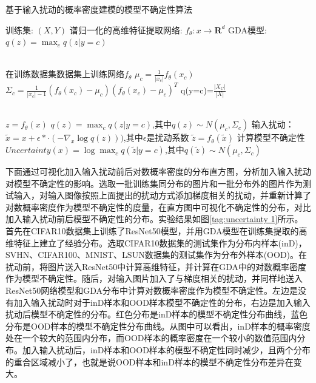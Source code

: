 \begin{algorithm}[h]
	\caption{基于输入扰动的概率密度建模的模型不确定性算法}
	\label{alg:1}
	
	\begin{algorithmic}[1]
		\Require 训练集: $(X,Y)$ 
		\Require 谱归一化的高维特征提取网络: $f_{\theta}:x \rightarrow \mathbf{R}^d $ 
		\Require GDA模型: $q(z) = \max_{c}q(z|y=c)$
		
		\\
		\State 在训练数据集数据集上训练网络$f_{\theta}$
		\State $\mu_{c}=\frac{1}{|x_c|}f_{\theta}(x_c)$
		\State $\Sigma_c = \frac{1}{|x_c|-1}(f_{\theta}(x_c)-\mu_c)(f_{\theta}(x_c)-\mu_c)^T$
		\State q(y=c)=$\frac{|X_C|}{|X|}$
		\EndFor
		\EndProcedure

		
		\\
		\State $z=f_{\theta}(x)$
		\State  $q(z) = \max_{c}q(z|y=c)$,其中$q(z)\sim N(\mu_c,\Sigma_c)$
		\State 输入扰动：$\tilde{x}=x+\epsilon* \cdot (-\nabla_x \log q(z)))$,其中$\epsilon$是扰动系数
		\State $\tilde{z}=f_{\theta}(\tilde{x})$
		\State 计算模型不确定性 $Uncertainty(x) = \log \max_{c}q(\tilde{z}|y=c)$,其中$q(\tilde{z})\sim N(\mu_c,\Sigma_c)$
		\EndProcedure 
	\end{algorithmic}
\end{algorithm}


下面通过可视化加入输入扰动前后对数概率密度的分布直方图，分析加入输入扰动对模型不确定性的影响。选取一批训练集同分布的图片和一批分布外的图片作为测试输入，对输入图像按照上面提出的扰动方式添加梯度相关的扰动，并重新计算了对数概率密度作为模型不确定性的度量，在直方图中可视化不确定性的分布，对比加入输入扰动前后模型不确定性的分布。实验结果如图\ref{tag:uncertainty 1}所示。首先在CIFAR10数据集上训练了ResNet50模型，并用GDA模型在训练集提取的高维特征上建立了经验分布。选取CIFAR10数据集的测试集作为分布内样本(inD)，SVHN、CIFAR100、MNIST、LSUN数据集的测试集作为分布外样本(OOD)。在扰动前，将图片送入ResNet50中计算高维特征，并计算在GDA中的对数概率密度作为模型不确定性。随后，对输入图片加入了与梯度相关的扰动，并同样地送入ResNet50网络模型和GDA分布中计算对数概率密度作为模型不确定性。左边是没有加入输入扰动时对于inD样本和OOD样本模型不确定性的分布，右边是加入输入扰动后模型不确定性的分布。红色分布是inD样本的模型不确定性分布曲线，蓝色分布是OOD样本的模型不确定性分布曲线。从图中可以看出，inD样本的概率密度处在一个较大的范围内分布，而OOD样本的概率密度在一个较小的数值范围内分布。加入输入扰动后，inD样本和OOD样本的模型不确定性同时减少，且两个分布的重合区域减小了，也就是说OOD样本和inD样本的模型不确定性分布差异在变大。

